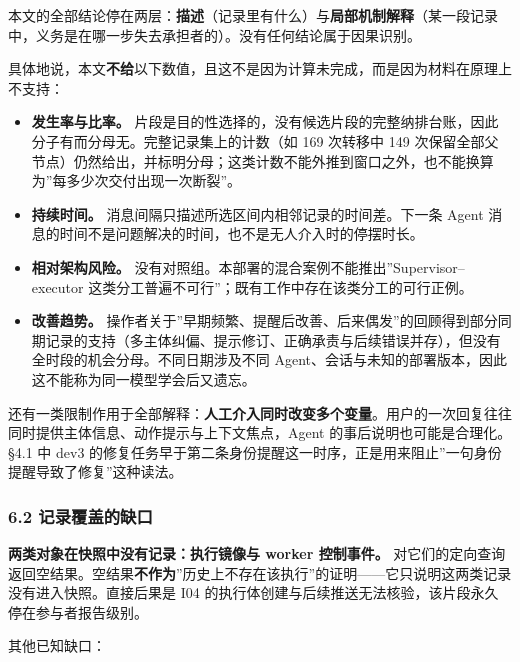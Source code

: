 \documentclass[
]{article}
\providecommand{\tightlist}{%
  \setlength{\itemsep}{0pt}\setlength{\parskip}{0pt}}
\begin{document}
本文的全部结论停在两层：\textbf{描述}（记录里有什么）与\textbf{局部机制解释}（某一段记录中，义务是在哪一步失去承担者的）。没有任何结论属于因果识别。

具体地说，本文\textbf{不给}以下数值，且这不是因为计算未完成，而是因为材料在原理上不支持：

\begin{itemize}
\tightlist
\item
  \textbf{发生率与比率。}
  片段是目的性选择的，没有候选片段的完整纳排台账，因此分子有而分母无。完整记录集上的计数（如
  169 次转移中 149
  次保留全部父节点）仍然给出，并标明分母；这类计数不能外推到窗口之外，也不能换算为''每多少次交付出现一次断裂''。
\item
  \textbf{持续时间。} 消息间隔只描述所选区间内相邻记录的时间差。下一条
  Agent 消息的时间不是问题解决的时间，也不是无人介入时的停摆时长。
\item
  \textbf{相对架构风险。}
  没有对照组。本部署的混合案例不能推出''Supervisor--executor
  这类分工普遍不可行''；既有工作中存在该类分工的可行正例。
\item
  \textbf{改善趋势。}
  操作者关于''早期频繁、提醒后改善、后来偶发''的回顾得到部分同期记录的支持（多主体纠偏、提示修订、正确承责与后续错误并存），但没有全时段的机会分母。不同日期涉及不同
  Agent、会话与未知的部署版本，因此这不能称为同一模型学会后又遗忘。
\end{itemize}

还有一类限制作用于全部解释：\textbf{人工介入同时改变多个变量}。用户的一次回复往往同时提供主体信息、动作提示与上下文焦点，Agent
的事后说明也可能是合理化。§4.1 中 dev3
的修复任务早于第二条身份提醒这一时序，正是用来阻止''一句身份提醒导致了修复''这种读法。

\subsubsection{6.2
记录覆盖的缺口}\label{ux8bb0ux5f55ux8986ux76d6ux7684ux7f3aux53e3}

\textbf{两类对象在快照中没有记录：执行镜像与 worker 控制事件。}
对它们的定向查询返回空结果。空结果\textbf{不作为}''历史上不存在该执行''的证明------它只说明这两类记录没有进入快照。直接后果是
I04 的执行体创建与后续推送无法核验，该片段永久停在参与者报告级别。

其他已知缺口：
\end{document}
